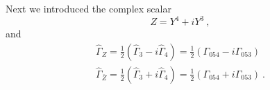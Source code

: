\documentclass[12pt]{article}
\newcommand{\hG}{{\hat \Gamma}}
\numberwithin{equation}{section}
\begin{document}
Next we introduced the complex scalar
\begin{equation}
Z=Y^{4}+iY^{3}\ ,
\end{equation}
and 
\begin{eqnarray}
\hat\Gamma_{Z} = \frac{1}{2} (\hat\Gamma_3 - i\hat\Gamma_4)=\frac{1}{2} (\Gamma_{054} - i\Gamma_{053}) \nonumber \\
\hat\Gamma_{\bar{Z}} =\frac{1}{2}(\hat\Gamma_3 + i \hat\Gamma_4)= \frac{1}{2}(\Gamma_{054} + i \Gamma_{053})\ .
\end{eqnarray}



\end{document}
